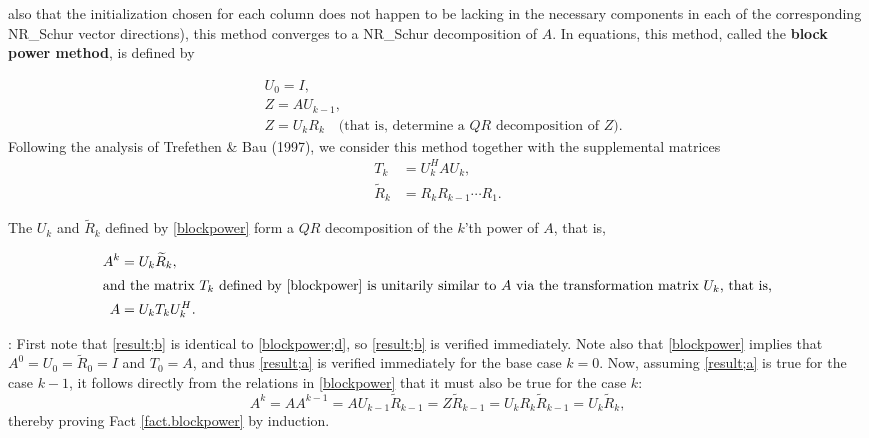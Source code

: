 also that the initialization chosen
for each column does not happen to be lacking in the necessary components in each of the corresponding NR_Schur vector
directions),
this method converges to a NR_Schur decomposition of $A$.  In equations, this method,
called the {\bf block power method}, is defined by
\begin{subeqnA}
\label{blockpower}
\begin{align}
& {U}_{0}=I, \label{blockpower;a}\\
& Z=A{U}_{k-1}, \label{blockpower;b}\\
& Z={U}_{k} {R}_{k} \quad \textrm{(that is, determine a $QR$ decomposition of $Z$)}.\label{blockpower;c}
\end{align}
Following the analysis of Trefethen \& Bau (1997), we consider this method together with the supplemental matrices
\begin{align}
T_{k}&={U}_{k}^H A {U}_{k},\label{blockpower;d}\\
{\widetilde R}_{k}&=R_{k} R_{k-1} \cdots R_{1}.  \label{blockpower;e}
\end{align}
\end{subeqnA}

\begin{fact} \label{fact.blockpower}
The ${U}_{k}$ and ${\widetilde R}_{k}$ defined by \eqref{blockpower}
form a $QR$ decomposition of the $k$'th power of $A$, that is,
\begin{subeqnA}
\label{result}
\begin{align}
A^k &= {U}_{k} {\widetilde R}_{k}, \label{result;a} \\
\intertext{and the matrix $T_{k}$ defined by \eqref{blockpower} is
unitarily similar to $A$ via the transformation matrix ${U}_{k}$, that is,}
A &= {U}_{k} T_{k} {U}_{k}^H. \label{result;b}
\end{align}
\end{subeqnA}
\end{fact}
\enlargethispage{3pt}

\/: 
First note that \eqref{result;b} is identical to \eqref{blockpower;d}, so \eqref{result;b} is verified immediately.  Note also
that \eqref{blockpower} implies that $A^0={U}_{0}={\widetilde R}_{0}=I$ and $T_{0}=A$, and thus \eqref{result;a}
is verified immediately for the base case $k=0$.  Now, assuming \eqref{result;a} is true for the case $k-1$,
it follows directly from the relations in \eqref{blockpower} that it must also be true for the case $k$:
\begin{equation*}
   A^k = A A^{k-1} = A {U}_{k-1} {\widetilde R}_{k-1} = Z {\widetilde R}_{k-1}
   = {U}_{k} {R}_{k} {\widetilde R}_{k-1} = {U}_{k} {\widetilde R}_{k},
\end{equation*}
thereby proving Fact \ref{fact.blockpower} by induction. \endproof

